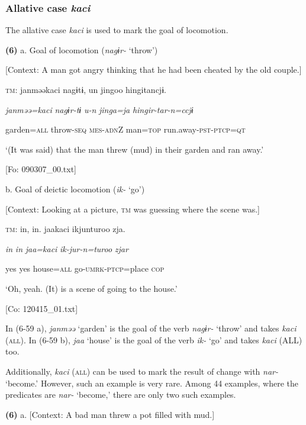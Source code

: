 \subsubsection{Allative case \textit{kaci}}

The allative case \textit{kaci} is used to mark the goal of locomotion.

\textbf{(6)}  a.  Goal of locomotion (\textit{nagɨr-} ‘throw’)

    [Context: A man got angry thinking that he had been cheated by the old couple.]

    \textsc{tm}:  janməəkaci  nagɨtɨ,  un  jingoo  hingitancjɨ.

      \textit{janməə=kaci}  \textit{nagɨr-tɨ}  \textit{u-n}  \textit{jinga=ja}  \textit{hingir-tar-n=ccjɨ}

      garden=\textsc{all}  throw-\textsc{seq}  \textsc{mes}-\textsc{adn}Z  man=\textsc{top}  run.away-\textsc{pst}-\textsc{ptcp}=\textsc{qt}

      ‘(It was said) that the man threw (mud) in their garden and ran away.’

      [Fo: 090307\_00.txt]

  b.  Goal of deictic locomotion (\textit{ik-} ‘go’)

    [Context: Looking at a picture, \textsc{tm} was guessing where the scene was.]

    \textsc{tm}:  in,  in.  jaakaci  ikjunturoo  zja.

      \textit{in}  \textit{in}  \textit{jaa=kaci}  \textit{ik-jur-n=turoo}  \textit{zjar}

      yes  yes  house=\textsc{all}  go-\textsc{umrk}-\textsc{ptcp}=place  \textsc{cop}

      ‘Oh, yeah. (It) is a scene of going to the house.’

      [Co: 120415\_01.txt]

In (6-59 a), \textit{janməə} ‘garden’ is the goal of the verb \textit{nagɨr-} ‘throw’ and takes \textit{kaci} (\textsc{all}). In (6-59 b), \textit{jaa} ‘house’ is the goal of the verb \textit{ik-} ‘go’ and takes \textit{kaci} (ALL) too.

Additionally, \textit{kaci} (\textsc{all}) can be used to mark the result of change with \textit{nar-} ‘become.’ However, such an example is very rare. Among 44 examples, where the predicates are \textit{nar-} ‘become,’ there are only two such examples.

\textbf{(6)}  a.  [Context: A bad man threw a pot filled with mud.]

